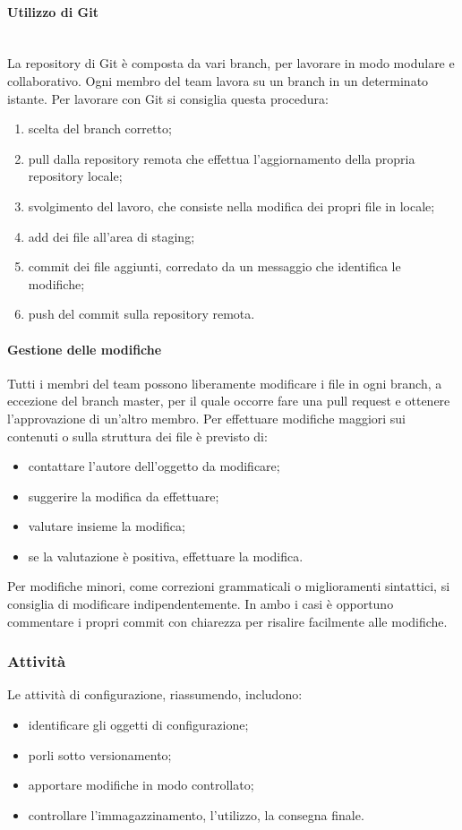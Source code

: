 	\paragraph{Utilizzo di Git} \mbox{}\\
	La repository di Git è composta da vari branch, per lavorare in modo modulare e collaborativo. Ogni membro del team lavora su un branch in un determinato istante.\newline 
	Per lavorare con Git si consiglia questa procedura:
	\begin{enumerate}
		\item scelta del branch corretto;
		\item pull dalla repository remota che effettua l'aggiornamento della propria repository locale;
		\item svolgimento del lavoro, che consiste nella modifica dei propri file in locale;
		\item add dei file all'area di staging;
		\item commit dei file aggiunti, corredato da un messaggio che identifica le modifiche;
		\item push del commit sulla repository remota.
	\end{enumerate}
	\paragraph{Gestione delle modifiche}
	Tutti i membri del team possono liberamente modificare i file in ogni branch, a eccezione del branch master, per il quale occorre fare una pull request e ottenere l'approvazione di un'altro membro.\newline
	Per effettuare modifiche maggiori sui contenuti o sulla struttura dei file è previsto di:
	\begin{itemize}
		\item contattare l'autore dell'oggetto da modificare;
		\item suggerire la modifica da effettuare;
		\item valutare insieme la modifica;
		\item se la valutazione è positiva, effettuare la modifica.
	\end{itemize}
	Per modifiche minori, come correzioni grammaticali o miglioramenti sintattici, si consiglia di modificare indipendentemente.\newline
	In ambo i casi è opportuno commentare i propri commit con chiarezza per risalire facilmente alle modifiche.
	\subsubsection{Attività}
	Le attività di configurazione, riassumendo, includono:
	\begin{itemize}
		\item identificare gli oggetti di configurazione;
		\item porli sotto versionamento;
		\item apportare modifiche in modo controllato;
		\item controllare l'immagazzinamento, l'utilizzo, la consegna finale.
	\end{itemize}


